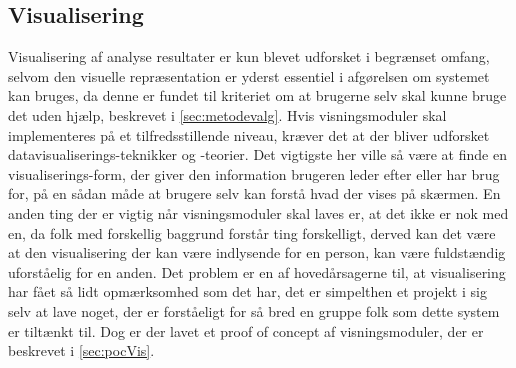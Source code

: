 \subsection{Visualisering}\label{sec:soevnVisVidArb}
Visualisering af analyse resultater er kun blevet udforsket i begrænset omfang, selvom den visuelle repræsentation er yderst essentiel i afgørelsen om systemet kan bruges, da denne er fundet til kriteriet om at brugerne selv skal kunne bruge det uden hjælp, beskrevet i \cref{sec:metodevalg}.
Hvis visningsmoduler skal implementeres på et tilfredsstillende niveau, kræver det at der bliver udforsket datavisualiserings-teknikker og -teorier.
Det vigtigste her ville så være at finde en visualiserings-form, der giver den information brugeren leder efter eller har brug for, på en sådan måde at brugere selv kan forstå hvad der vises på skærmen.
En anden ting der er vigtig når visningsmoduler skal laves er, at det ikke er nok med en, da folk med forskellig baggrund forstår ting forskelligt, derved kan det være at den visualisering der kan være indlysende for en person, kan være fuldstændig uforståelig for en anden.
Det problem er en af hovedårsagerne til, at visualisering har fået så lidt opmærksomhed som det har, det er simpelthen et projekt i sig selv at lave noget, der er forståeligt for så bred en gruppe folk som dette system er tiltænkt til.
Dog er der lavet et proof of concept af visningsmoduler, der er beskrevet i \cref{sec:pocVis}.